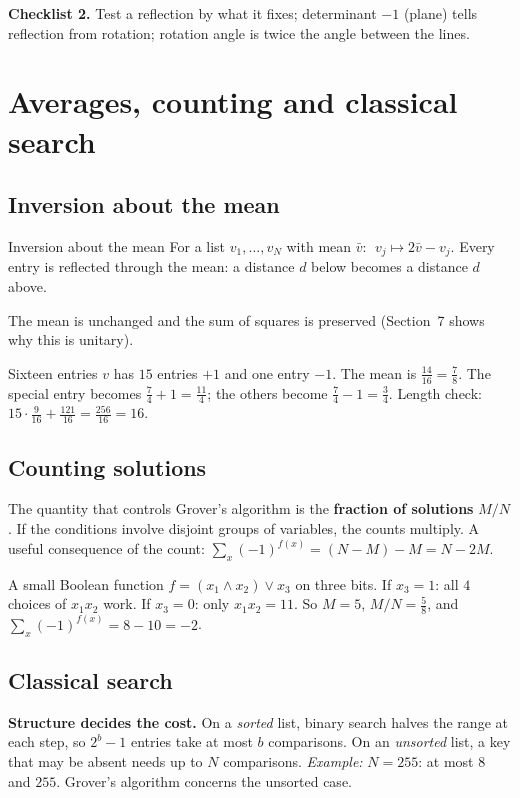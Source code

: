 \documentclass[11pt,a4paper,openany]{book}
\newcounter{wex}[section]
\begin{document}
\textbf{Checklist 2.} Test a reflection by what it fixes; determinant $-1$ (plane) tells reflection from rotation; rotation angle is twice the angle between the lines.

\section{Averages, counting and classical search}
\subsection{Inversion about the mean}
\begin{defn}{Inversion about the mean}
For a list $v_1, \dots, v_N$ with mean $\bar v$: $\;v_j \mapsto 2\bar v - v_j$. Every entry is reflected through the mean: a distance $d$ below becomes a distance $d$ above.
\end{defn}
The mean is unchanged and the sum of squares is preserved (Section~7 shows why this is unitary).
\begin{wexample}{Sixteen entries}
$v$ has $15$ entries $+1$ and one entry $-1$. The mean is $\frac{14}{16} = \frac78$. The special entry becomes $\frac74 + 1 = \frac{11}{4}$; the others become $\frac74 - 1 = \frac34$.
Length check: $15\cdot\frac{9}{16} + \frac{121}{16} = \frac{256}{16} = 16$. \checkmark
\end{wexample}

\subsection{Counting solutions}
The quantity that controls Grover's algorithm is the \textbf{fraction of solutions} $M/N$. If the conditions involve disjoint groups of variables, the counts multiply.
A useful consequence of the count: $\sum_x(-1)^{f(x)} = (N - M) - M = N - 2M$.
\begin{wexample}{A small Boolean function}
$f = (x_1 \land x_2) \lor x_3$ on three bits. If $x_3 = 1$: all $4$ choices of $x_1x_2$ work. If $x_3 = 0$: only $x_1x_2 = 11$. So $M = 5$, $M/N = \frac58$, and $\sum_x(-1)^{f(x)} = 8 - 10 = -2$.
\end{wexample}

\subsection{Classical search}
\textbf{Structure decides the cost.} On a \emph{sorted} list, binary search halves the range at each step, so $2^{b} - 1$ entries take at most $b$ comparisons. On an \emph{unsorted} list, a key that may be absent needs up to $N$ comparisons. \emph{Example:} $N = 255$: at most $8$ and $255$. Grover's algorithm concerns the unsorted case.
\end{document}
